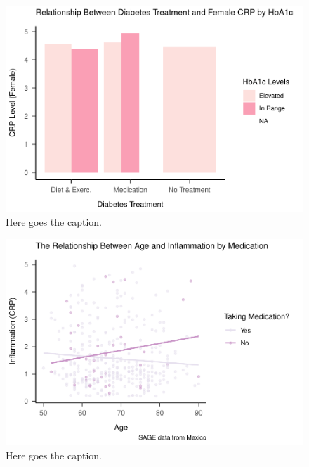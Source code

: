 \documentclass[
  man]{apa6}
\begin{document}
\begin{figure}
\centering
\includegraphics{NEW_Final_Groupof5_files/figure-latex/crp-by-sex-female-1.pdf}
\caption{\label{fig:crp-by-sex-female}Here goes the caption.}
\end{figure}



\begin{figure}
\centering
\includegraphics{NEW_Final_Groupof5_files/figure-latex/RQ1plot-1.pdf}
\caption{\label{fig:RQ1plot}Here goes the caption.}
\end{figure}
\end{document}

